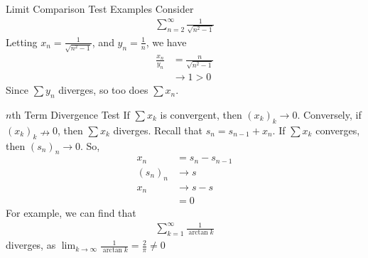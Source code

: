\documentclass[10pt]{extarticle}
\begin{document}
  \begin{problem}{Limit Comparison Test Examples}
    Consider
    \begin{align*}
      \sum_{n=2}^{\infty}\frac{1}{\sqrt{n^2 -1}}
    \end{align*}
    Letting $x_n = \frac{1}{\sqrt{n^2 - 1}}$, and $y_n = \frac{1}{n}$, we have
    \begin{align*}
      \frac{x_n}{y_n} &= \frac{n}{\sqrt{n^2 - 1}}\\
                      &\rightarrow 1 > 0
    \end{align*}
    Since $\sum y_n$ diverges, so too does $\sum x_n$.
  \end{problem}
  \begin{problem}{$n$th Term Divergence Test}
    If $\sum x_k$ is convergent, then $(x_k)_k \rightarrow 0$. Conversely, if $(x_k)_k \nrightarrow 0$, then $\sum x_k$ diverges.
    Recall that $s_n = s_{n-1} + x_n$. If $\sum x_k$ converges, then $(s_n)_n \rightarrow 0$. So,
    \begin{align*}
      x_n &= s_n - s_{n-1}\\
      (s_n)_n &\rightarrow s\\
      x_n &\rightarrow s - s\\
          &= 0
    \end{align*}
    For example, we can find that
    \begin{align*}
      \sum_{k=1}^{\infty}\frac{1}{\arctan{k}}
    \end{align*}
    diverges, as $\lim_{k\rightarrow\infty}\frac{1}{\arctan{k}} = \frac{2}{\pi} \neq 0$
  \end{problem}
\end{document}
